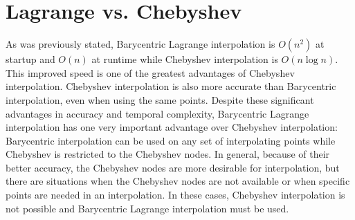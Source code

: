 \begin{comment}
Once the coefficients of the Chebyshev polynomial have been computed, there exists a fast algorithm (discussed in the Additional Material section) for evaluating the polynomials.
NumPy's \li{polynomial.chebyshev} module contains a method for doing this.
\begin{lstlisting}
>>> from NumPy.polynomial.chebyshev import chebval

>>> domain = np.linspace(-1, 1, 5)
>>> f = lambda x: x**4              # Function to interpolate.
>>> coeffs = chebyshv_coeffs(f, 4)  # Function from Problem 5.
>>> print(coeffs)
[  3.75000000e-01  -5.88784672e-17   5.00000000e-01   5.88784672e-17
   1.25000000e-01]

>>> chebval(domain, coeffs)         # Evaluate at the points in domain.
[ 1.      0.0625  0.      0.0625  1.    ]
\end{lstlisting}

NumPy's \li{polynomial.chebyshev} module has many useful functions for working with Chebyshev polynomials.
Some of the methods include fast implementations of polynomial operations such as addition, division, multiplication, and integration.
\end{comment}

\section*{Lagrange vs. Chebyshev}

As was previously stated, Barycentric Lagrange interpolation is $O(n^2)$ at startup and $O(n)$ at runtime while Chebyshev interpolation is $O(n\log n)$.
This improved speed is one of the greatest advantages of Chebyshev interpolation.
Chebyshev interpolation is also more accurate than Barycentric interpolation, even when using the same points.
Despite these significant advantages in accuracy and temporal complexity, Barycentric Lagrange interpolation has one very important advantage over Chebyshev interpolation: Barycentric interpolation can be used on any set of interpolating points while Chebyshev is restricted to the Chebyshev nodes.
In general, because of their better accuracy, the Chebyshev nodes are more desirable for interpolation, but there are situations when the Chebyshev nodes are not available or when specific points are needed in an interpolation.
In these cases, Chebyshev interpolation is not possible and Barycentric Lagrange interpolation must be used.


